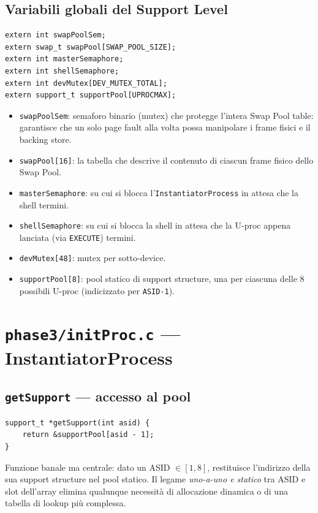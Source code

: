 \documentclass[11pt,a4paper]{article}
\newcommand{\code}[1]{\texttt{#1}}
\newcommand{\func}[1]{\textbf{\texttt{#1}}}
\begin{document}
\subsection{Variabili globali del Support Level}
\begin{lstlisting}
extern int swapPoolSem;
extern swap_t swapPool[SWAP_POOL_SIZE];
extern int masterSemaphore;
extern int shellSemaphore;
extern int devMutex[DEV_MUTEX_TOTAL];
extern support_t supportPool[UPROCMAX];
\end{lstlisting}
\begin{itemize}
\item \code{swapPoolSem}: semaforo binario (mutex) che protegge l'intera
  Swap Pool table: garantisce che un solo page fault alla volta possa
  manipolare i frame fisici e il backing store.
\item \code{swapPool[16]}: la tabella che descrive il contenuto di ciascun
  frame fisico dello Swap Pool.
\item \code{masterSemaphore}: su cui si blocca l'\code{InstantiatorProcess}
  in attesa che la shell termini.
\item \code{shellSemaphore}: su cui si blocca la shell in attesa che la
  U-proc appena lanciata (via \code{EXECUTE}) termini.
\item \code{devMutex[48]}: mutex per sotto-device.
\item \code{supportPool[8]}: pool statico di support structure, una per
  ciascuna delle 8 possibili U-proc (indicizzato per \code{ASID-1}).
\end{itemize}

\section{\code{phase3/initProc.c} --- InstantiatorProcess}

\subsection{\func{getSupport} --- accesso al pool}
\begin{lstlisting}
support_t *getSupport(int asid) {
    return &supportPool[asid - 1];
}
\end{lstlisting}
Funzione banale ma centrale: dato un ASID $\in [1,8]$, restituisce
l'indirizzo della sua support structure nel pool statico. Il legame
\emph{uno-a-uno e statico} tra ASID e slot dell'array elimina qualunque
necessità di allocazione dinamica o di una tabella di lookup più complessa.
\end{document}
